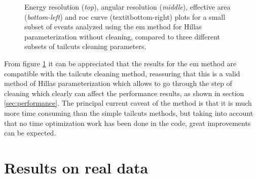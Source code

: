 \documentclass[main.tex]{subfiles}
\begin{document}
\begin{figure}
\endminipage
  \caption{Energy resolution (\textit{top}), angular resolution (\textit{middle}), effective area (\textit{bottom-left}) and \gls{roc} curve (textit{bottom-right}) plots for a small subset of events analyzed using the \gls{em} method for Hillas parameterization without cleaning, compared to three different subsets of tailcuts cleaning parameters. }
    \label{fig:em_res}
\end{figure}

From figure \ref{fig:em_res} it can be appreciated that the results for the \gls{em} method are compatible with the tailcuts cleaning method, reassuring that this is a valid method of Hillas parameterization which allows to go through the step of cleaning which clearly can affect the performance results, as shown in section \ref{sec:performance}. The principal current caveat of the method is that it is much more time consuming than the simple tailcuts methods, but taking into account that no time optimization work has been done in the code, great improvements can be expected. 
\section{Results on real data}
\end{document}
